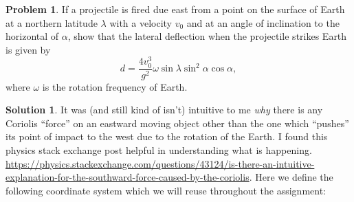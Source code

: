 \documentclass[10pt]{article}
\theoremstyle{definition}
\newtheorem{problem}{Problem}
\newtheorem{soln}{Solution}
\begin{document}
\begin{problem}
If a projectile is fired due east from a point on the surface of Earth at a northern latitude $\lambda$ with
a velocity $v_0$ and at an angle of inclination to the horizontal of $\alpha$, show that the lateral deflection
when the projectile strikes Earth is given by
$$d=\frac{4v_0^3}{g^2}\omega\sin\lambda\sin^2\alpha\cos\alpha,$$ where $\omega$ is the rotation frequency of Earth.
\end{problem}
\begin{soln}
  It was (and still kind of isn't) intuitive to me \emph{why} there is any Coriolis ``force'' on an eastward moving object other than the one
  which ``pushes'' its point of impact to the west due to the rotation of the Earth. I found this physics stack exchange post helpful in understanding what is happening.
  \url{https://physics.stackexchange.com/questions/43124/is-there-an-intuitive-explanation-for-the-southward-force-caused-by-the-coriolis}. Here we define the following coordinate system which we will reuse
  throughout the assignment:
  \begin{center}
\end{center}
\end{soln}
\end{document}
